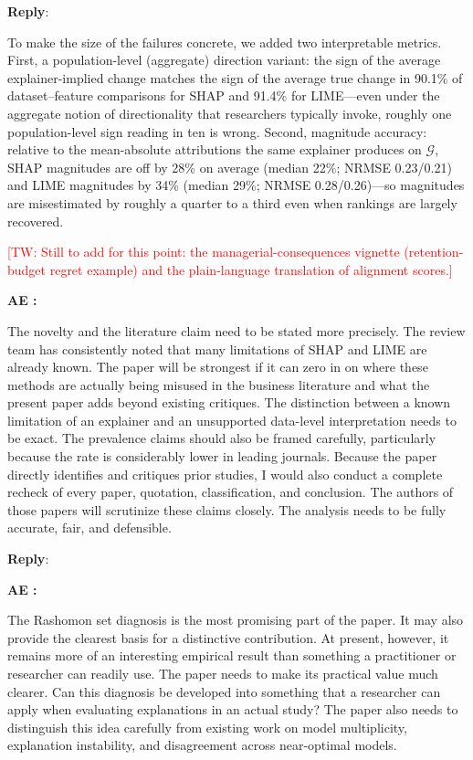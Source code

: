 \documentclass[11pt]{article}
\newcommand{\tw}[1]{\textcolor{red}{[TW: #1]}}
\newcounter{se}[section]
\newcounter{aed}[section]
\newenvironment{aed}[1][]{%
    \refstepcounter{aed}\par\medskip\noindent%
    \textbf{AE \theaed: #1}\rmfamily\itshape%
}{\medskip}
\newcounter{reviewer}
\newcounter{point}[reviewer]
\newenvironment{reply}
 {\par\medskip \noindent \begin{sf}\textbf{Reply}:\ }
 {\medskip \end{sf}}
\begin{document}
\begin{reply}
{To make the size of the failures concrete, we added two interpretable metrics. First, a population-level (aggregate) direction variant: the sign of the average explainer-implied change matches the sign of the average true change in 90.1\% of dataset--feature comparisons for SHAP and 91.4\% for LIME---even under the aggregate notion of directionality that researchers typically invoke, roughly one population-level sign reading in ten is wrong. Second, magnitude accuracy: relative to the mean-absolute attributions the same explainer produces on $\mathcal{G}$, SHAP magnitudes are off by 28\% on average (median 22\%; NRMSE 0.23/0.21) and LIME magnitudes by 34\% (median 29\%; NRMSE 0.28/0.26)---so magnitudes are misestimated by roughly a quarter to a third even when rankings are largely recovered.

\tw{Still to add for this point: the managerial-consequences vignette (retention-budget regret example) and the plain-language translation of alignment scores.}
}
\end{reply}


\begin{aed}
The novelty and the literature claim need to be stated more precisely. The review team has consistently noted that many limitations of SHAP and LIME are already known. The paper will be strongest if it can zero in on where these methods are actually being misused in the business literature and what the present paper adds beyond existing critiques. The distinction between a known limitation of an explainer and an unsupported data-level interpretation needs to be exact. The prevalence claims should also be framed carefully, particularly because the rate is considerably lower in leading journals. Because the paper directly identifies and critiques prior studies, I would also conduct a complete recheck of every paper, quotation, classification, and conclusion. The authors of those papers will scrutinize these claims closely. The analysis needs to be fully accurate, fair, and defensible.
\end{aed}

\begin{reply}

\end{reply}


\begin{aed}
The Rashomon set diagnosis is the most promising part of the paper. It may also provide the clearest basis for a distinctive contribution. At present, however, it remains more of an interesting empirical result than something a practitioner or researcher can readily use. The paper needs to make its practical value much clearer. Can this diagnosis be developed into something that a researcher can apply when evaluating explanations in an actual study? The paper also needs to distinguish this idea carefully from existing work on model multiplicity, explanation instability, and disagreement across near-optimal models.
\end{aed}
\end{document}
